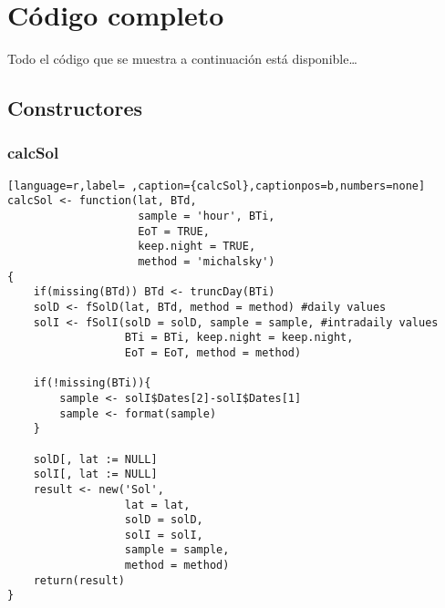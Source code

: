 \chapter{Código completo}
\label{chap:codigo-completo}

Todo el código que se muestra a continuación está disponible\ldots{}

\section{Constructores}
\label{sec:org0a204ab}
\subsection{calcSol}
\label{sec:orgf53cdb3}
\label{subsec:calcsol}
\begin{lstlisting}[language=r,label= ,caption={calcSol},captionpos=b,numbers=none]
calcSol <- function(lat, BTd,
                    sample = 'hour', BTi,
                    EoT = TRUE,
                    keep.night = TRUE,
                    method = 'michalsky')
{
    if(missing(BTd)) BTd <- truncDay(BTi)
    solD <- fSolD(lat, BTd, method = method) #daily values
    solI <- fSolI(solD = solD, sample = sample, #intradaily values
                  BTi = BTi, keep.night = keep.night,
                  EoT = EoT, method = method)

    if(!missing(BTi)){
        sample <- solI$Dates[2]-solI$Dates[1]
        sample <- format(sample)
    }

    solD[, lat := NULL]
    solI[, lat := NULL]
    result <- new('Sol',
                  lat = lat,
                  solD = solD,
                  solI = solI,
                  sample = sample,
                  method = method)
    return(result)
}
\end{lstlisting}
